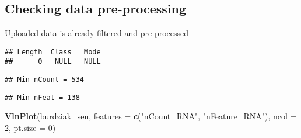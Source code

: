 \documentclass[
]{article}
\newenvironment{Shaded}{\begin{snugshade}}{\end{snugshade}}
\newcommand{\AttributeTok}[1]{\textcolor[rgb]{0.13,0.29,0.53}{#1}}
\newcommand{\CommentTok}[1]{\textcolor[rgb]{0.56,0.35,0.01}{\textit{#1}}}
\newcommand{\DecValTok}[1]{\textcolor[rgb]{0.00,0.00,0.81}{#1}}
\newcommand{\FunctionTok}[1]{\textcolor[rgb]{0.13,0.29,0.53}{\textbf{#1}}}
\newcommand{\NormalTok}[1]{#1}
\newcommand{\OtherTok}[1]{\textcolor[rgb]{0.56,0.35,0.01}{#1}}
\newcommand{\SpecialCharTok}[1]{\textcolor[rgb]{0.81,0.36,0.00}{\textbf{#1}}}
\newcommand{\StringTok}[1]{\textcolor[rgb]{0.31,0.60,0.02}{#1}}
\begin{document}
\subsection{Checking data
pre-processing}\label{checking-data-pre-processing}

Uploaded data is already filtered and pre-processed

\begin{Shaded}
\end{Shaded}

\begin{verbatim}
## Length  Class   Mode 
##      0   NULL   NULL
\end{verbatim}

\begin{Shaded}
\end{Shaded}

\begin{verbatim}
## Min nCount = 534
\end{verbatim}

\begin{Shaded}
\end{Shaded}

\begin{verbatim}
## Min nFeat = 138
\end{verbatim}

\begin{Shaded}
\begin{Highlighting}[]
\FunctionTok{VlnPlot}\NormalTok{(burdziak\_seu, }\AttributeTok{features =} \FunctionTok{c}\NormalTok{(}\StringTok{"nCount\_RNA"}\NormalTok{, }\StringTok{"nFeature\_RNA"}\NormalTok{),}
        \AttributeTok{ncol =} \DecValTok{2}\NormalTok{, }\AttributeTok{pt.size =} \DecValTok{0}\NormalTok{)}
\end{Highlighting}
\end{Shaded}
\end{document}
